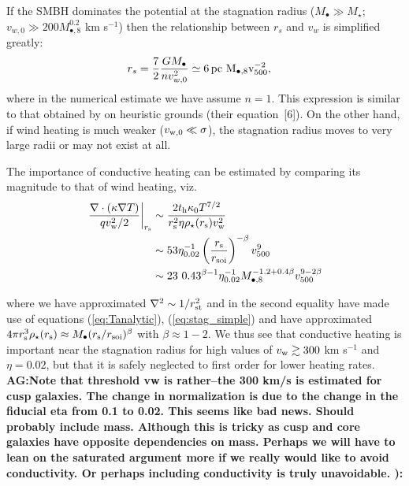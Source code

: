 \documentclass[usenatbib,fleqn]{mn2e}
\newcommand{\rs}{r_s}
\newcommand{\pc}{\rm pc}
\newcommand{\Mbh}[1][]{M_{\bullet#1}}
\newcommand{\Mbheight}{M_{\bullet,8}}
\newcommand{\vwO}{v_{w,0}}
\begin{document}
If the SMBH dominates the potential at the stagnation radius
($M_{\bullet} \gg M_{\star}$; $v_{w,0} \gg 200 M_{\bullet,8}^{0.2}$ km
s$^{-1}$) then the relationship between $\rs$ and $v_{w}$ is
simplified greatly:
\begin{align}
  &\rs=\frac{7}{2}\frac{G \Mbh}{n \vwO^2} \simeq 6
 \, \pc \,\, \Mbheight v_{500}^{-2},
  \label{eq:stag_simple}
\end{align}
where in the numerical estimate we have assume $n = 1$.  This expression is similar to that obtained by \citet{Volonteri+11} on heuristic grounds (their equation~[6]).  On the other hand, if wind heating is much weaker ($v_{\rm w,0} \ll \sigma$), the stagnation radius moves to very large radii or may not exist at all.  

The importance of conductive heating can be estimated by comparing its
magnitude to that of wind heating, viz.~
\begin{align} \left.\frac{\nabla\cdot(\kappa \nabla T)}{q v_{\rm
w}^{2}/2}\right|_{r_{\rm s}} &\sim \frac{2t_{\rm h}\kappa_0
T^{7/2}}{r_{\rm s}^{2}\eta \rho_{\star}(r_{\rm s}) v_{\rm w}^{2}}
\nonumber \\ &\sim
53 \eta_{0.02}^{-1}\left(\frac{r_{\rm s}}{r_{\rm
soi}}\right)^{-\beta} v_{500}^{9} \nonumber \\ &\sim
23 \,\, 0.43^{\beta-1} \eta_{0.02}^{-1}
M_{\bullet,8}^{-1.2+0.4\beta} v_{500}^{9-2\beta}
\label{eq:condRatio1}
\end{align}

where we have approximated $\nabla^{2} \sim 1/r_{\rm st}^{2}$ and in
the second equality have made use of equations (\ref{eq:Tanalytic}),
(\ref{eq:stag_simple}) and have approximated $4\pi r_{\rm
  s}^{3}\rho_{\star}(r_{\rm s}) \approx M_{\bullet}(r_{\rm s}/r_{\rm
  soi})^{\beta}$ with $\beta \approx 1-2$.  We thus see that
conductive heating is important near the stagnation radius for high
values of $v_{\rm w} \gtrsim 300$ km s$^{-1}$ and $\eta=0.02$, but
that it is safely neglected to first order for lower heating
rates. {\bf AG:Note that threshold vw is rather--the 300 km/s is
  estimated for cusp galaxies. The change in normalization is due to
  the change in the fiducial eta from 0.1 to 0.02. This seems like bad
  news. Should probably include mass. Although this is tricky as cusp
  and core galaxies have opposite dependencies on mass. Perhaps we
  will have to lean on the saturated argument more if we really would
  like to avoid conductivity. Or perhaps including conductivity is
  truly unavoidable. ):}
\end{document}
